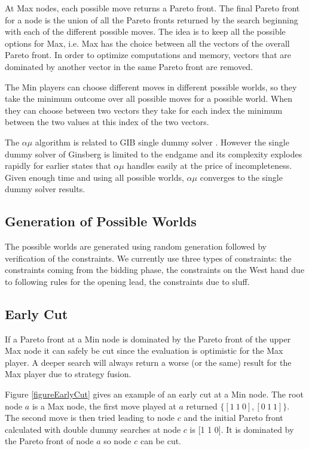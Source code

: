 \documentclass[letterpaper]{article} %
\begin{document}
At Max nodes, each possible move returns a Pareto front. The final Pareto front for a node is the union of all the Pareto fronts returned by the search beginning with each of the different possible moves. The idea is to keep all the possible options for Max, i.e. Max has the choice between all the vectors of the overall Pareto front. In order to optimize computations and memory, vectors that are dominated by another vector in the same Pareto front are removed.

The Min players can choose different moves in different possible worlds, so they take the minimum outcome over all possible moves for a possible world. When they can choose between two vectors they take for each index the minimum between the two values at this index of the two vectors.

The $\alpha\mu$ algorithm is related to GIB single dummy solver \cite{ginsberg2001}. However the single dummy solver of Ginsberg is limited to the endgame and its complexity explodes rapidly for earlier states that $\alpha\mu$ handles easily at the price of incompleteness. Given enough time and using all possible worlds, $\alpha\mu$ converges to the single dummy solver results.

\subsection{Generation of Possible Worlds}

The possible worlds are generated using random generation followed by verification of the constraints. We currently use three types of constraints: the constraints coming from the bidding phase, the constraints on the West hand due to following rules for the opening lead, the constraints due to sluff.

\subsection{Early Cut}

If a Pareto front at a Min node is dominated by the Pareto front of the upper Max node it can safely be cut since the evaluation is optimistic for the Max player. A deeper search will always return a worse (or the same) result for the Max player due to strategy fusion.

Figure \ref{figureEarlyCut} gives an example of an early cut at a Min node. The root node $a$ is a Max node, the first move played at $a$ returned $\{[1~1~0],[0~1~1]\}$. The second move is then tried leading to node $c$ and the initial Pareto front calculated with double dummy searches at node $c$ is [1 1 0]. It is dominated by the Pareto front of node $a$ so node $c$ can be cut.
\end{document}
